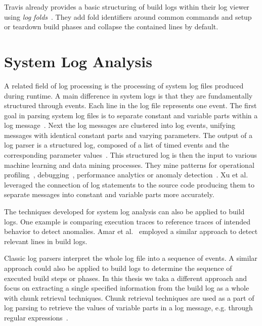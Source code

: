 \documentclass[\myrootdir/main.tex]{subfiles}
\begin{document}
Travis already provides a basic structuring of build logs within their log viewer using \emph{log folds}~\cite{travis2019logfolds}.
They add fold identifiers around common commands and setup or teardown build phases and collapse the contained lines by default.

\section{System Log Analysis}

A related field of log processing is the processing of system log files produced during runtime.
A main difference in system logs is that they are fundamentally structured through events.
Each line in the log file represents one event.
The first goal in parsing system log files is to separate constant and variable parts within a log message~\cite{nagappan2010abstracting,he2017towards}.
Next the log messages are clustered into log events, unifying messages with identical constant parts and varying parameters.
The output of a log parser is a structured log, composed of a list of timed events and the corresponding parameter values~\cite{he2016evaluation}.
This structured log is then the input to various machine learning and data mining processes.
They mine patterns for operational profiling~\cite{nagappan2009efficiently}, debugging~\cite{oliner2012advances}, performance analytics or anomaly detection~\cite{nagappan2010abstracting}.
Xu et al.~\cite{xu2009detecting} leveraged the connection of log statements to the source code producing them to separate messages into constant and variable parts more accurately.

The techniques developed for system log analysis can also be applied to build logs.
One example is comparing execution traces to reference traces of intended behavior to detect anomalies.
Amar et al.~\cite{amar2019mining} employed a similar approach to detect relevant lines in build logs.

Classic log parsers interpret the whole log file into a sequence of events.
A similar approach could also be applied to build logs to determine the sequence of executed build steps or phases.
In this thesis we taka a different approach and focus on extracting a single specified information from the build log as a whole with chunk retrieval techniques.
Chunk retrieval techniques are used as a part of log parsing to retrieve the values of variable parts in a log message, e.g. through regular expressions~\cite{nagappan2010abstracting,xu2009detecting}.
\end{document}
